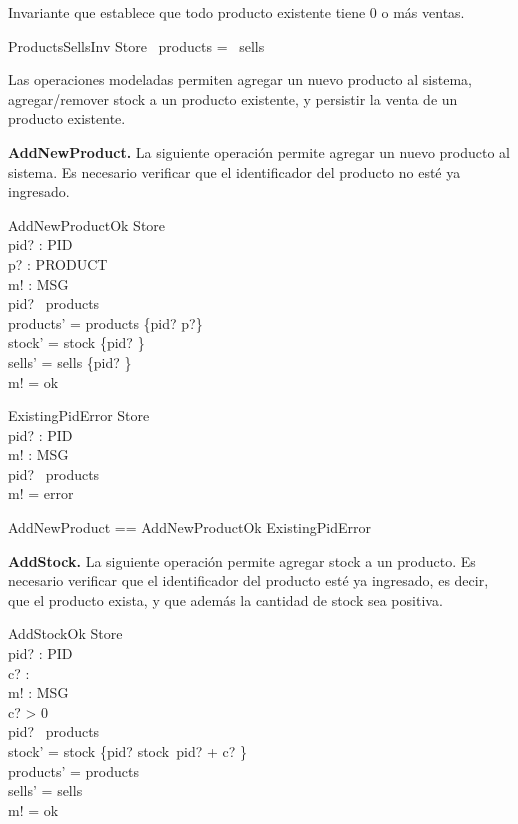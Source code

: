 \documentclass[fleqn,colorlinks,linkcolor=blue,citecolor=blue,urlcolor=blue]{article}
\begin{document}
Invariante que establece que todo producto existente tiene 0 o más ventas.

\begin{schema}{ProductsSellsInv}
Store
\where
\dom~products = \dom~sells
\end{schema}

\newpage

Las operaciones modeladas permiten agregar un nuevo producto al sistema, agregar/remover stock a un producto existente, y persistir la venta de un producto existente.

\vspace{0.3cm}

\noindent
\textbf{AddNewProduct.} La siguiente operación permite agregar un nuevo producto al sistema. Es necesario verificar que el identificador del producto no esté ya ingresado.

\begin{schema}{AddNewProductOk}
\Delta Store \\
pid? : PID \\
p? : PRODUCT \\
m! : MSG \\
\where
pid? \notin \dom~products \\
products' = products \cup \{pid? \mapsto p?\} \\
stock' = stock \cup \{pid? \} \\
sells' = sells \cup \{pid? \mapsto \langle \rangle\} \\
m! = ok 
\end{schema}

\begin{schema}{ExistingPidError}
\Xi Store \\
pid? : PID \\
m! : MSG \\
\where
pid? \in \dom~products \\
m! = error
\end{schema}

\begin{zed}
AddNewProduct == AddNewProductOk \lor ExistingPidError
\end{zed}

\noindent
\textbf{AddStock.} La siguiente operación permite agregar stock a un producto. Es necesario verificar que el identificador del producto esté ya ingresado, es decir, que el producto exista, y que además la cantidad de stock sea positiva.

\begin{schema}{AddStockOk}
\Delta Store \\
pid? : PID \\
c? : \nat \\
m! : MSG \\
\where
c? > 0 \\
pid? \in \dom~products \\
stock' = stock \oplus \{pid? \mapsto stock~pid? + c? \} \\
products' = products \\
sells' = sells \\
m! = ok
\end{schema}
\end{document}

